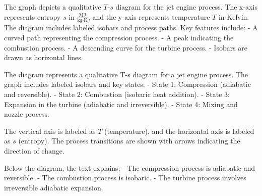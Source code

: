 The graph depicts a qualitative \( T \)-\( s \) diagram for the jet engine process. The x-axis represents entropy \( s \) in \( \frac{\text{MJ}}{\text{kg·K}} \), and the y-axis represents temperature \( T \) in Kelvin. The diagram includes labeled isobars and process paths. Key features include:  
- A curved path representing the compression process.  
- A peak indicating the combustion process.  
- A descending curve for the turbine process.  
- Isobars are drawn as horizontal lines.

The diagram represents a qualitative T-s diagram for a jet engine process. The graph includes labeled isobars and key states:  
- State 1: Compression (adiabatic and reversible).  
- State 2: Combustion (isobaric heat addition).  
- State 3: Expansion in the turbine (adiabatic and irreversible).  
- State 4: Mixing and nozzle process.  

The vertical axis is labeled as \( T \) (temperature), and the horizontal axis is labeled as \( s \) (entropy). The process transitions are shown with arrows indicating the direction of change.  

Below the diagram, the text explains:  
- The compression process is adiabatic and reversible.  
- The combustion process is isobaric.  
- The turbine process involves irreversible adiabatic expansion.